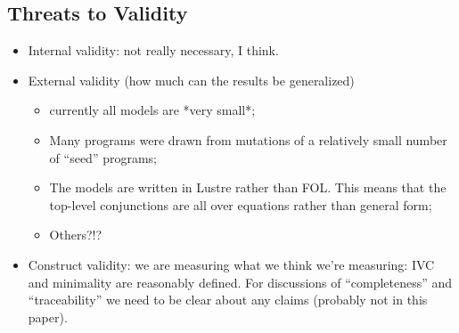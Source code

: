 \subsection{Threats to Validity}

\begin{itemize}
    \item Internal validity: not really necessary, I think.
    \item External validity (how much can the results be generalized)
    \begin{itemize}
        \item currently all models are *very small*;
        \item Many programs were drawn from mutations of a relatively small number of ``seed'' programs;
        \item The models are written in Lustre rather than FOL.  This means that the
            top-level conjunctions are all over equations rather than general
            form;
        \item Others?!?
    \end{itemize}
    \item Construct validity: we are measuring what we think we're measuring: IVC and minimality are reasonably defined.  For discussions of ``completeness'' and ``traceability'' we need to be clear about any claims (probably not in this paper).
\end{itemize}



